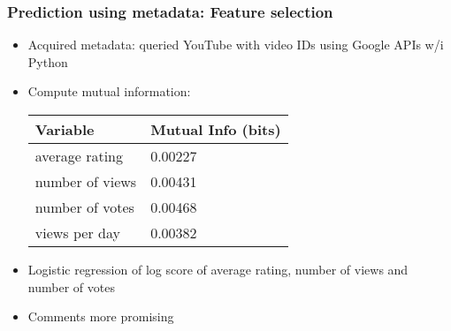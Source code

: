\documentclass[fleqn]{beamer}
\begin{document}
\begin{frame}
\frametitle{Prediction using metadata: Feature selection}
      \begin{itemize}
      	\item Acquired metadata: queried YouTube with video IDs using Google APIs w/i Python
          \item Compute mutual information: \\
          		\begin{center}
        			\begin{tabular}{ | l | l |}
			\hline
			Variable & Mutual Info (bits) \\ \hline
			average rating & 0.00227\\ \hline
			number of views & 0.00431\\ \hline
			number of votes & 0.00468\\ \hline
			views per day & 0.00382 \\
			\hline
			\end{tabular}
					
      		\end{center}	
          \item Logistic regression of log score of average rating, number of views and number of votes
          \item Comments more promising
      \end{itemize}

\end{frame}
\end{document}
